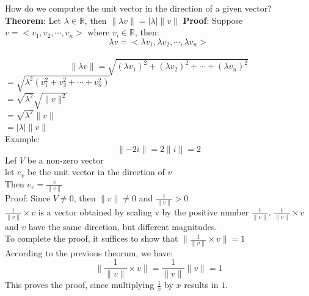 \documentclass[]{article}
\begin{document}
    How do we computer the unit vector in the direction of a given vector?\\
    \textbf{Theorem}: Let $\lambda \in \mathbb{R}$, then $\lVert \lambda v\rVert = \lvert \lambda \rvert  \lVert v \rVert$
    \textbf{Proof}: Suppose $v = <v_1, v_2, \cdots, v_n>$ where $v_i \in \mathbb{R}$, then:\\
    \begin{equation}
        \lambda v = <\lambda v_1, \lambda v_2, \cdots, \lambda v_n>
    \end{equation}\\
    \begin{equation*}
        \lVert \lambda v \rVert = \sqrt{(\lambda v_1)^2 + (\lambda v_2)^2 + \cdots + (\lambda v_n)^2}
    \end{equation*}
    $ = \sqrt{\lambda^2(v_1^2 + v_2^2 + \cdots + v_n^2)}$\\
    $ = \sqrt{\lambda^2}\sqrt{\lVert v \rVert^2}$\\
    $ = \sqrt{\lambda^2}\lVert v \rVert$\\
    $ = \lvert \lambda \rvert \lVert v \rVert$\\
    Example:
    \begin{equation*}
        \lVert -2i \rVert = 2\lVert i \rVert = 2
    \end{equation*}
    Lef $V$ be a non-zero vector\\
    let $e_v$ be the unit vector in the direction of $v$\\
    Then $e_v = \frac{v}{\lVert v \rVert}$\\
    Proof: Since $V \neq 0$, then $\lVert v \rVert \neq 0$ and $\frac{1}{\lVert v \rVert} > 0$\\
    $\frac{1}{\lVert v \rVert} \times v$ is a vector obtained by scaling v by the positive number $\frac{1}{\lVert v \rVert}$.
    $\frac{1}{\lVert v \rVert} \times v$ and $v$ have the same direction, but different magnitudes.\\
    To complete the proof, it suffices to show that $\lVert \frac{1}{\lVert v \rVert} \times v \rVert = 1$\\
    According to the previous theorum, we have:\\
    \begin{equation*}
        \lVert \frac{1}{\lVert v \rVert} \times v \rVert = \frac{1}{\lVert v \rVert} \lVert v \rVert = 1
    \end{equation*}
    This proves the proof, since multiplying $\frac{1}{x}$ by $x$ results in $1$.\\
\end{document}
